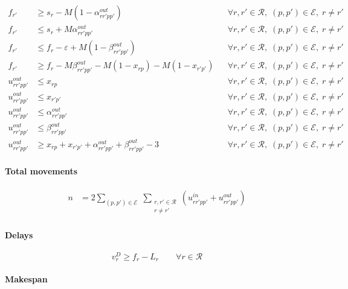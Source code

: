 \begin{align}
f_{r'} &\ge s_r - M \left( 1 - \alpha^{out}_{rr'pp'} \right)
&& \forall r,r' \in \mathcal{R},\; (p,p') \in \mathcal{E},\; r \neq r' \\
f_{r'} &\le s_r + M \alpha^{out}_{rr'pp'}
&& \forall r,r' \in \mathcal{R},\; (p,p') \in \mathcal{E},\; r \neq r' \\
f_{r'} &\le f_r - \varepsilon + M \left( 1 - \beta^{out}_{rr'pp'} \right)
&& \forall r,r' \in \mathcal{R},\; (p,p') \in \mathcal{E},\; r \neq r' \\
f_{r'} &\ge f_r - M \beta^{out}_{rr'pp'} - M(1-x_{rp}) - M(1-x_{r'p'})
&& \forall r,r' \in \mathcal{R},\; (p,p') \in \mathcal{E},\; r \neq r' \\
u^{out}_{rr'pp'} &\le x_{rp}
&& \forall r,r' \in \mathcal{R},\; (p,p') \in \mathcal{E},\; r \neq r' \\
u^{out}_{rr'pp'} &\le x_{r'p'}
&& \forall r,r' \in \mathcal{R},\; (p,p') \in \mathcal{E},\; r \neq r' \\
u^{out}_{rr'pp'} &\le \alpha^{out}_{rr'pp'}
&& \forall r,r' \in \mathcal{R},\; (p,p') \in \mathcal{E},\; r \neq r' \\
u^{out}_{rr'pp'} &\le \beta^{out}_{rr'pp'}
&& \forall r,r' \in \mathcal{R},\; (p,p') \in \mathcal{E},\; r \neq r' \\
u^{out}_{rr'pp'} &\ge x_{rp} + x_{r'p'} + \alpha^{out}_{rr'pp'} + \beta^{out}_{rr'pp'} - 3
&& \forall r,r' \in \mathcal{R},\; (p,p') \in \mathcal{E},\; r \neq r'
\end{align}

\paragraph{Total movements}

\begin{align}
n &= 2 \sum_{(p,p')\in \mathcal{E}}\;
\sum_{\substack{r,r' \in \mathcal{R}\\ r \neq r'}}
\left( u^{in}_{rr'pp'} + u^{out}_{rr'pp'} \right)
\end{align}

\paragraph{Delays}

\begin{equation}
v^{D}_r \ge f_r - L_r
\qquad \forall r \in \mathcal{R}
\end{equation}

\paragraph{Makespan}


